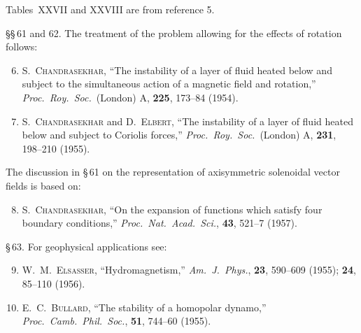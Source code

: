 \noindent Tables~XXVII and XXVIII are from reference 5.

\noindent\S\S\,61 and 62. The treatment of the problem allowing for the effects
of rotation follows:
\begin{enumerate}\setcounter{enumi}{5}
\item S.\ \textsc{Chandrasekhar}, ``The instability of a layer of fluid heated below
and subject to the simultaneous action of a magnetic field and rotation,''
\emph{Proc.\ Roy.\ Soc.}\ (London) A, \textbf{225}, 173--84 (1954).
\item S.\ \textsc{Chandrasekhar} and D.\ \textsc{Elbert}, ``The instability of a layer of
fluid heated below and subject to Coriolis forces,'' \emph{Proc.\ Roy.\ Soc.}\
(London) A, \textbf{231}, 198--210 (1955).
\end{enumerate}

\noindent The discussion in \S\,61 on the representation of axisymmetric solenoidal vector fields
is based on:
\begin{enumerate}\setcounter{enumi}{7}
\item S.\ \textsc{Chandrasekhar}, ``On the expansion of functions which satisfy
four boundary conditions,'' \emph{Proc.\ Nat.\ Acad.\ Sci.}, \textbf{43}, 521--7
(1957).
\end{enumerate}

\noindent\S\,63. For geophysical applications see:
\begin{enumerate}\setcounter{enumi}{8}
\item W.\ M.\ \textsc{Elsasser}, ``Hydromagnetism,'' \emph{Am.\ J.\ Phys.}, \textbf{23}, 590--609 (1955);
\textbf{24}, 85--110 (1956).
\item E.\ C.\ \textsc{Bullard}, ``The stability of a homopolar dynamo,'' \emph{Proc.\
Camb.\ Phil.\ Soc.}, \textbf{51}, 744--60 (1955).
\end{enumerate}
